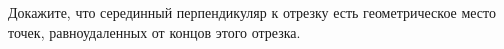 Докажите, что серединный перпендикуляр к отрезку есть геометрическое место точек, равноудаленных от концов этого отрезка.